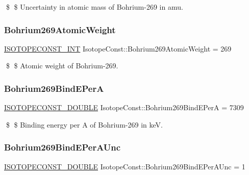 \$ \$ Uncertainty in atomic mass of Bohrium-\/269 in amu. \mbox{\label{group___isotope_const-_bohrium-_bh269_ga1162d67307e69774a4e907ad2013d976}} 
\subsubsection{\texorpdfstring{Bohrium269\+Atomic\+Weight}{Bohrium269AtomicWeight}}
{\footnotesize\ttfamily \mbox{\hyperlink{group___isotope_const-_macros_ga5f18360b3e99483a35c32d789e62621c}{I\+S\+O\+T\+O\+P\+E\+C\+O\+N\+S\+T\+\_\+\+I\+NT}} Isotope\+Const\+::\+Bohrium269\+Atomic\+Weight = 269}

\$ \$ Atomic weight of Bohrium-\/269. \mbox{\label{group___isotope_const-_bohrium-_bh269_ga4ce1e0ac6270247c06725ec72ceb8c98}} 
\subsubsection{\texorpdfstring{Bohrium269\+Bind\+E\+PerA}{Bohrium269BindEPerA}}
{\footnotesize\ttfamily \mbox{\hyperlink{group___isotope_const-_macros_ga8f45a7272ce02c0b4c65c44636ed719a}{I\+S\+O\+T\+O\+P\+E\+C\+O\+N\+S\+T\+\_\+\+D\+O\+U\+B\+LE}} Isotope\+Const\+::\+Bohrium269\+Bind\+E\+PerA = 7309}

\$ \$ Binding energy per A of Bohrium-\/269 in keV. \mbox{\label{group___isotope_const-_bohrium-_bh269_gae211a6081e3280db8fd2e42bd6f1b24d}} 
\subsubsection{\texorpdfstring{Bohrium269\+Bind\+E\+Per\+A\+Unc}{Bohrium269BindEPerAUnc}}
{\footnotesize\ttfamily \mbox{\hyperlink{group___isotope_const-_macros_ga8f45a7272ce02c0b4c65c44636ed719a}{I\+S\+O\+T\+O\+P\+E\+C\+O\+N\+S\+T\+\_\+\+D\+O\+U\+B\+LE}} Isotope\+Const\+::\+Bohrium269\+Bind\+E\+Per\+A\+Unc = 1}

